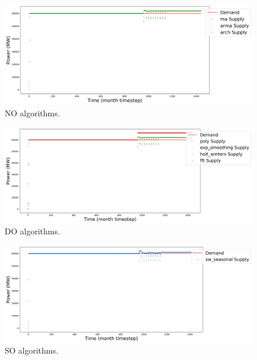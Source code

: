 \documentclass[11pt]{article}
\begin{document}
\begin{figure}[H]
	\centering
	\includegraphics[width=\textwidth]{23-figures/23-power-buffer01.png} 
	\hfill
	\caption{NO algorithms.}
	\label{fig:23-NO}
\end{figure}

\begin{figure}[H]
	\centering
	\includegraphics[width=\textwidth]{23-figures/23-power-buffer02.png} 
	\hfill
	\caption{DO algorithms.}
	\label{fig:23-DO}
\end{figure}

\begin{figure}[H]
	\centering
	\includegraphics[width=\textwidth]{23-figures/23-power-buffer03.png} 
	\hfill
	\caption{SO algorithms.}
	\label{fig:23-SO}
\end{figure}
\end{document}
